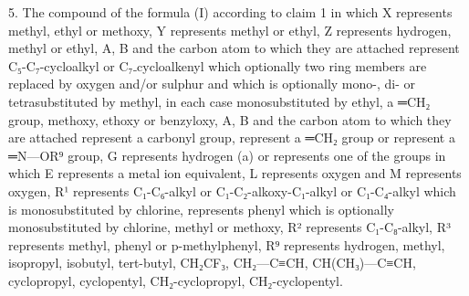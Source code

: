\documentclass[11pt,a4paper]{article}
\begin{document}
5. The compound of the formula (I) according to claim 1 in which X represents methyl, ethyl or methoxy, Y represents methyl or ethyl, Z represents hydrogen, methyl or ethyl, A, B and the carbon atom to which they are attached represent C₅-C₇-cycloalkyl or C₇₋cycloalkenyl which optionally two ring members are replaced by oxygen and/or sulphur and which is optionally mono-, di- or tetrasubstituted by methyl, in each case monosubstituted by ethyl, a ═CH₂ group, methoxy, ethoxy or benzyloxy, A, B and the carbon atom to which they are attached represent a carbonyl group, represent a ═CH₂ group or represent a ═N—OR⁹ group, G represents hydrogen (a) or represents one of the groups in which E represents a metal ion equivalent, L represents oxygen and M represents oxygen, R¹ represents C₁-C₆-alkyl or C₁-C₂-alkoxy-C₁-alkyl or C₁-C₄-alkyl which is monosubstituted by chlorine, represents phenyl which is optionally monosubstituted by chlorine, methyl or methoxy, R² represents C₁-C₈-alkyl, R³ represents methyl, phenyl or p-methylphenyl, R⁹ represents hydrogen, methyl, isopropyl, isobutyl, tert-butyl, CH₂CF₃, CH₂—C≡CH, CH(CH₃)—C≡CH, cyclopropyl, cyclopentyl, CH₂-cyclopropyl, CH₂-cyclopentyl.
\end{document}
